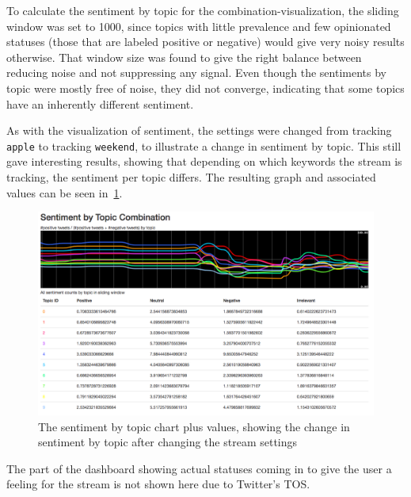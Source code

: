 To calculate the sentiment by topic for the combination-visualization,
the sliding window was set to 1000, since topics with little prevalence and few opinionated statuses
(those that are labeled positive or negative) would give very noisy results otherwise.
That window size was found to give the right balance between reducing noise and not suppressing any signal.
Even though the sentiments by topic were mostly free of noise, they did not converge,
indicating that some topics have an inherently different sentiment.

As with the visualization of sentiment,
the settings were changed from tracking \texttt{apple} to tracking \texttt{weekend}, to illustrate a change in sentiment by topic.
This still gave interesting results, showing that depending on which keywords the stream is tracking,
the sentiment per topic differs.
The resulting graph and associated values can be seen in~\cref{fig:dashboard-sentiment-by-topic}.

\begin{figure}
    \centering
    \caption{The sentiment by topic chart plus values, showing the change in sentiment by topic after changing the stream settings}
    \label{fig:dashboard-sentiment-by-topic}
    \includegraphics[width=\textwidth]{../images/dashboard_sentiment_by_topic.png}
\end{figure}

The part of the dashboard showing actual statuses coming in to give the user a feeling for the stream is not shown here due to Twitter's TOS.